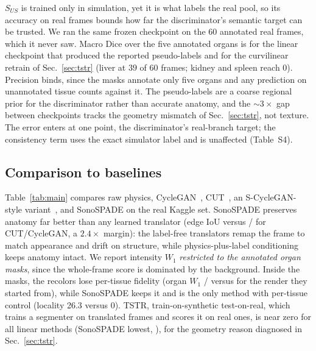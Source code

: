 \documentclass[runningheads]{llncs}
\begin{document}
$S_{US}$ is trained only in simulation, yet it is what
labels the real pool, so its accuracy on real frames bounds how far the discriminator's semantic target can
be trusted. We ran the same frozen checkpoint on the $60$ annotated real frames, which it never saw. Macro Dice over the five annotated organs is \realDiceLin{}
for the linear checkpoint that produced the reported pseudo-labels and \realDiceCurvi{} for the
curvilinear retrain of Sec.~\ref{sec:tstr} (liver \realDiceLiverCurvi{} at $39$ of $60$ frames; kidney
and spleen reach $0$). Precision binds, since the masks annotate only five organs and any prediction on
unannotated tissue counts against it. The pseudo-labels are a coarse regional prior for the discriminator
rather than accurate anatomy, and the ${\sim}3\times$ gap between checkpoints tracks the geometry mismatch
of Sec.~\ref{sec:tstr}, not texture. The error enters at one point, the discriminator's real-branch
target; the consistency term uses the exact simulator label and is unaffected (Table~S4).

\subsection{Comparison to baselines}
\label{sec:baselines}
Table~\ref{tab:main} compares raw physics, CycleGAN~\cite{zhu2017cyclegan}, CUT~\cite{park2020cut}, an
S-CycleGAN-style variant~\cite{song2024scyclegan}, and SonoSPADE on the real Kaggle set.
SonoSPADE preserves anatomy far better than any learned translator (edge IoU \iouSono{} versus \iouCUT{}/\iouCyc{} for CUT/CycleGAN, a $2.4\times$ margin): the label-free translators remap the frame to match appearance and drift on structure, while physics-plus-label conditioning keeps anatomy intact. 
We report intensity $W_1$ \emph{restricted to the annotated organ masks}, since the whole-frame score is dominated by the background. 
Inside the masks, the recolors lose per-tissue fidelity (organ $W_1$ \wCyc{}/\wCUT{} versus \wPhys{} for the render they started from), while SonoSPADE keeps it and is the only method with per-tissue control (locality 26.3 versus $0$). 
TSTR, train-on-synthetic test-on-real, which trains a segmenter on translated frames and scores it on real ones, is near zero for all linear methods (SonoSPADE lowest, \tstrSono{}), for the geometry reason diagnosed in Sec.~\ref{sec:tstr}.
\end{document}
